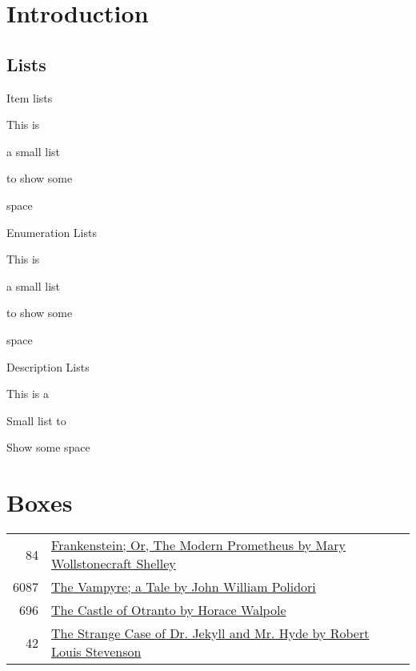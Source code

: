 \documentclass[a4paper]{article}
\begin{document}
\begin{multicols}{3}\scriptsize

    \section{Introduction}
    \subsection{Lists}
    Item lists
    \begin{itemize*}
        \item This is
        \item a small list
        \item to show some
        \item space
    \end{itemize*}

    Enumeration Lists
    \begin{enumerate*}
        \item This is
        \item a small list
        \item to show some
        \item space
    \end{enumerate*}

    Description Lists
    \begin{enumerate*}
        \item[This] is a
        \item[Small] list to
        \item[Show] some space
    \end{enumerate*}

    \columnbreak

    \section{Boxes}





    \begin{tabular}{r|p{}}\scriptsize
        84 & \href{http://www.gutenberg.org/ebooks/84}{Frankenstein; Or, The Modern Prometheus by Mary Wollstonecraft Shelley} \\
        6087 & \href{https://www.gutenberg.org/ebooks/6087}{The Vampyre; a Tale by John William Polidori} \\
        696 & \href{https://www.gutenberg.org/ebooks/696}{The Castle of Otranto by Horace Walpole} \\
        42 & \href{https://www.gutenberg.org/ebooks/42}{The Strange Case of Dr. Jekyll and Mr. Hyde by Robert Louis Stevenson}
    \end{tabular}
    

\end{multicols}
\end{document}
